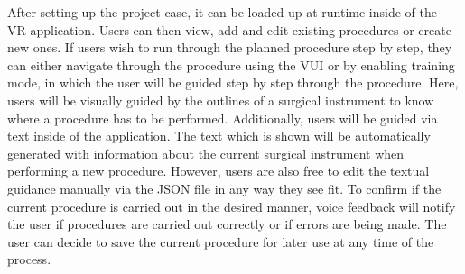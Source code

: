 After setting up the project case, it can be loaded up at runtime inside of the VR-application.
Users can then view, add and edit existing procedures or create new ones.
If users wish to run through the planned procedure step by step, they can either navigate through the procedure using the VUI or by enabling training mode, in which the user will 
be guided step by step through the procedure.
Here, users will be visually guided by the outlines of a surgical instrument to know where a procedure has to be performed.
Additionally, users will be guided via text inside of the application.
The text which is shown will be automatically generated with information about the current surgical instrument when performing a new procedure.
However, users are also free to edit the textual guidance manually via the JSON file in any way they see fit.
To confirm if the current procedure is carried out in the desired manner, voice feedback will notify the user if procedures are carried out correctly or if errors are being made.
The user can decide to save the current procedure for later use at any time of the process.